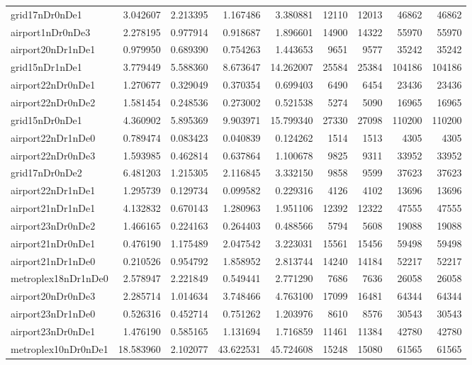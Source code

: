 \begin{longtable}{|l|r|r|r|r|r|r|r|r|}
grid17nDr0nDe1 & 3.042607 & 2.213395 & 1.167486 & 3.380881 & 12110 & 12013 & 46862 & 46862 \\
airport1nDr0nDe3 & 2.278195 & 0.977914 & 0.918687 & 1.896601 & 14900 & 14322 & 55970 & 55970 \\
airport20nDr1nDe1 & 0.979950 & 0.689390 & 0.754263 & 1.443653 & 9651 & 9577 & 35242 & 35242 \\
grid15nDr1nDe1 & 3.779449 & 5.588360 & 8.673647 & 14.262007 & 25584 & 25384 & 104186 & 104186 \\
airport22nDr0nDe1 & 1.270677 & 0.329049 & 0.370354 & 0.699403 & 6490 & 6454 & 23436 & 23436 \\
airport22nDr0nDe2 & 1.581454 & 0.248536 & 0.273002 & 0.521538 & 5274 & 5090 & 16965 & 16965 \\
grid15nDr0nDe1 & 4.360902 & 5.895369 & 9.903971 & 15.799340 & 27330 & 27098 & 110200 & 110200 \\
airport22nDr1nDe0 & 0.789474 & 0.083423 & 0.040839 & 0.124262 & 1514 & 1513 & 4305 & 4305 \\
airport22nDr0nDe3 & 1.593985 & 0.462814 & 0.637864 & 1.100678 & 9825 & 9311 & 33952 & 33952 \\
grid17nDr0nDe2 & 6.481203 & 1.215305 & 2.116845 & 3.332150 & 9858 & 9599 & 37623 & 37623 \\
airport22nDr1nDe1 & 1.295739 & 0.129734 & 0.099582 & 0.229316 & 4126 & 4102 & 13696 & 13696 \\
airport21nDr1nDe1 & 4.132832 & 0.670143 & 1.280963 & 1.951106 & 12392 & 12322 & 47555 & 47555 \\
airport23nDr0nDe2 & 1.466165 & 0.224163 & 0.264403 & 0.488566 & 5794 & 5608 & 19088 & 19088 \\
airport21nDr0nDe1 & 0.476190 & 1.175489 & 2.047542 & 3.223031 & 15561 & 15456 & 59498 & 59498 \\
airport21nDr1nDe0 & 0.210526 & 0.954792 & 1.858952 & 2.813744 & 14240 & 14184 & 52217 & 52217 \\
metroplex18nDr1nDe0 & 2.578947 & 2.221849 & 0.549441 & 2.771290 & 7686 & 7636 & 26058 & 26058 \\
airport20nDr0nDe3 & 2.285714 & 1.014634 & 3.748466 & 4.763100 & 17099 & 16481 & 64344 & 64344 \\
airport23nDr1nDe0 & 0.526316 & 0.452714 & 0.751262 & 1.203976 & 8610 & 8576 & 30543 & 30543 \\
airport23nDr0nDe1 & 1.476190 & 0.585165 & 1.131694 & 1.716859 & 11461 & 11384 & 42780 & 42780 \\
metroplex10nDr0nDe1 & 18.583960 & 2.102077 & 43.622531 & 45.724608 & 15248 & 15080 & 61565 & 61565 \\

\end{longtable}
